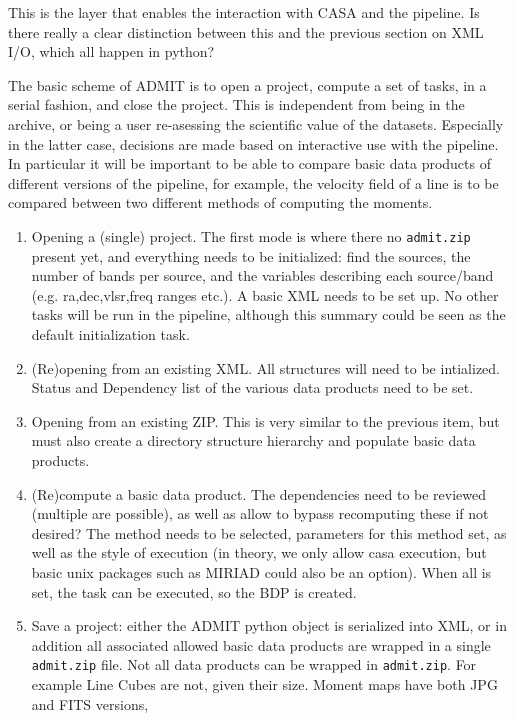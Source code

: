 \documentclass{report}
\begin{document}
This is the layer that enables the interaction with
CASA and the pipeline. Is there really a clear distinction 
between this and the previous section on XML I/O, which
all happen in python?

The basic scheme of ADMIT is to open a project, compute a set of
tasks, in a serial fashion, and close the project. This is independent
from being in the archive, or being a user re-asessing the scientific
value of the datasets. Especially in the latter case, decisions are
made based on interactive use with the pipeline. In particular it will
be important to be able to compare basic data products of different
versions of the pipeline, for example, the velocity field of a line is
to be compared between two different methods of computing the moments.

\begin{enumerate}

\item
Opening a (single) project. The first mode is where there no {\tt admit.zip} 
present yet, and everything needs to be initialized: find
the sources, the number of bands per source, and the variables
describing each source/band (e.g. ra,dec,vlsr,freq ranges etc.). A
basic XML needs to be set up.  No other tasks will be run in the
pipeline, although this summary could be seen as the default
initialization task.


\item
(Re)opening from an existing XML.  All structures will need to be 
intialized. Status and Dependency list of the various data products
need to be set.

\item
Opening from an existing ZIP. This is very similar to the previous
item, but must also create a directory structure hierarchy and 
populate basic data products.

\item
(Re)compute a basic data product. The dependencies need to be reviewed
(multiple are possible), as well as allow to bypass recomputing these
if not desired?  The method needs to be selected, parameters for this
method set, as well as the style of execution (in theory, we only
allow casa execution, but basic unix packages such as MIRIAD could 
also be an option).  When all is set, the task can be executed, so the
BDP is created.

\item
Save a project:  either the ADMIT python object is serialized into XML, 
or in addition all associated allowed basic data products 
are wrapped in a single {\tt admit.zip} file. Not all data products
can be wrapped in {\tt admit.zip}. For example Line Cubes are not, given
their size. Moment maps have both JPG and FITS versions, 


\end{enumerate}
\end{document}

